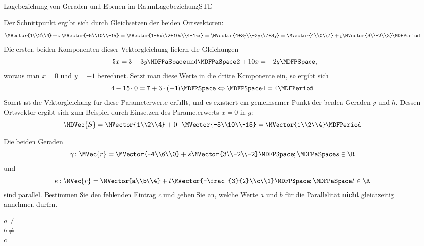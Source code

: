 \begin{MXContent}{Lagebeziehung von Geraden und Ebenen im Raum}{Lagebeziehung}{STD}
\begin{MExercise}
\begin{MHint}{\iSolution}
Der Schnittpunkt ergibt sich durch Gleichsetzen der beiden Ortsvektoren:
\[
 \MVector{1\\2\\4}+x\MVector{-5\\10\\-15}=\MVector{1-5x\\2+10x\\4-15x}=\MVector{4+3y\\-2y\\7+3y}=\MVector{4\\0\\7}+y\MVector{3\\-2\\3}\MDFPeriod
\]
Die ersten beiden Komponenten dieser Vektorgleichung liefern die Gleichungen
\[
 -5x=3+3y\MDFPaSpace\textrm{und}\MDFPaSpace 2+10x=-2y \MDFPSpace,
\]
woraus man $x=0$ und $y=-1$ berechnet. Setzt man diese Werte in die dritte Komponente ein, so ergibt sich
\[
 4-15\cdot 0=7+3\cdot(-1)\MDFPSpace\Leftrightarrow\MDFPSpace 4=4 \MDFPeriod
\]
Somit ist die Vektorgleichung für diese Parameterwerte erfüllt, und es existiert ein gemeinsamer Punkt der beiden Geraden $g$ und $h$. Dessen Ortsvektor ergibt sich zum Beispiel durch Einsetzen des Parameterwerts $x=0$ in $g$:
\[
 \MDVec{S}=\MVector{1\\2\\4}+0\cdot\MVector{-5\\10\\-15}=\MVector{1\\2\\4}\MDFPeriod
\]
\end{MHint}
\end{MExercise}


\begin{MExercise}
Die beiden Geraden
\[
 \gamma\colon\MVec{r}=\MVector{-4\\6\\0}+s\MVector{3\\-2\\-2}\MDFPSpace;\MDFPaSpace s\in\R 
\]
und
\[
 \kappa\colon\MVec{r}=\MVector{a\\b\\4}+t\MVector{-\frac{3}{2}\\c\\1}\MDFPSpace;\MDFPaSpace t\in\R 
\]
sind parallel. Bestimmen Sie den fehlenden Eintrag $c$ und geben Sie an, welche Werte $a$ und $b$ für die Parallelität \textbf{nicht} gleichzeitig annehmen dürfen. 

$a\neq$\\
$b\neq$\\
$c=$
\end{MExercise}


\end{MXContent}

